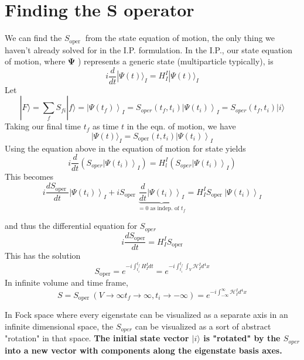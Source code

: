 \section{Finding the S operator}
We can find the $S_{\text {oper }}$ from the state equation of motion, the only thing we haven't already solved for in the I.P. formulation. In the I.P., our state equation of motion, where $\mathbf{\Psi}$ ) represents a generic state (multiparticle typically), is
$$
i \frac{d}{d t}|\Psi(t)\rangle_{I}=H_{I}^{I}|\Psi(t)\rangle_{I}
$$
Let
\begin{equation}
|F\rangle=\sum_{f} S_{f i}|f\rangle=\left|\Psi\left(t_{f}\right)\right\rangle_{I}=S_{o p e r}\left(t_{f}, t_{i}\right)\left|\Psi\left(t_{i}\right)\right\rangle_{I}=S_{o p e r}\left(t_{f}, t_{i}\right)|i\rangle
\end{equation}
Taking our final time $t_f$ as time $t$ in the eqn. of motion, we have
\begin{equation}
|\Psi(t)\rangle_{I}=S_{\text {oper}}\left(t, t_{i}\right)\left|\Psi\left(t_{i}\right)\right\rangle_{I}
\end{equation}
Using the equation  above in the equation of motion for state yields
\begin{equation}
i \frac{d}{d t}\left(S_{o p e r}\left|\Psi\left(t_{i}\right)\right\rangle_{I}\right)=H_{l}^{I}\left(S_{o p e r}\left|\Psi\left(t_{i}\right)\right\rangle_{I}\right)
\end{equation}
This becomes
\begin{equation}
i \frac{d S_{\text {oper }}}{d t}\left|\Psi\left(t_{i}\right)\right\rangle_{I}+i S_{\text {oper }}\underbrace{ \frac{d}{d t}\left|\Psi\left(t_{i}\right)\right\rangle_{I}}_{=0\text{ as indep. of }t_f}=H_{I}^{I} S_{\text {oper }}\left|\Psi\left(t_{i}\right)\right\rangle_{I}
\end{equation}
\begin{qt}
and thus the differential equation for $S_{oper}$
\begin{equation}
i \frac{d S_{\text {oper}}}{d t}=H_{I}^{I} S_{\text {oper}}
\end{equation}
This has the solution
\begin{equation}
S_{\text {oper}}=e^{-i \int_{t_{i}}^{t_{f}} H_{I}^{I} d t}=e^{-i \int_{t_{i}}^{t_f} \int_{V} \mathcal{H}_{I}^{I} d^{4} x}
\end{equation}
In infinite volume and time frame,
\begin{equation}
S=S_{\text {oper }}\left(V\rightarrow\infty t_{f} \rightarrow \infty, t_{i} \rightarrow-\infty\right)=e^{-i \int_{-\infty}^{\infty} \mathcal{H}_{I}^{I} d^{4} x}
\label{S-oper}
\end{equation}
\end{qt}
\begin{mybox}
In Fock space where every eigenstate can be visualized as a separate axis in an infinite dimensional space, the $S_{oper}$ can be visualized as a sort of abstract "rotation" in that space. \textbf{The initial state vector $|i\rangle$ is "rotated" by the $S_{oper}$ into a new vector with components along the eigenstate basis axes.}
\end{mybox}
